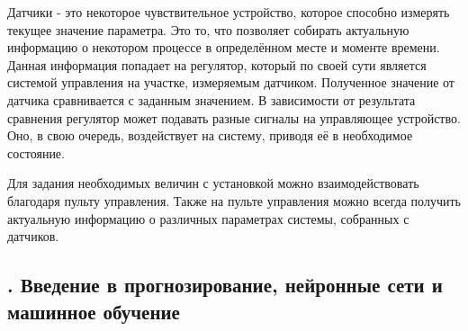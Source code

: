 {  \par \redline Датчики - это некоторое чувствительное устройство, которое способно измерять текущее значение параметра. Это то, что позволяет собирать актуальную информацию о некотором процессе в определённом месте и моменте времени. Данная информация попадает на регулятор, который по своей сути является системой управления на участке, измеряемым датчиком. Полученное значение от датчика сравнивается с заданным значением. В зависимости от результата сравнения регулятор может подавать разные сигналы на управляющее устройство. Оно, в свою очередь, воздействует на систему, приводя её в необходимое состояние.

  \par \redline Для задания необходимых величин с установкой можно взаимодействовать благодаря пульту управления. Также на пульте управления можно всегда получить актуальную информацию о различных параметрах системы, собранных с датчиков.

  \par
}

\subtitlespace

\subsection*{
  \gostTitleFont
  \redline
  \thechaptercntr .\thesubchaptercntr \spc
  Введение в прогнозирование, нейронные сети и машинное обучение
} \addtocounter{subchaptercntr}{1}

\subtitlespace


